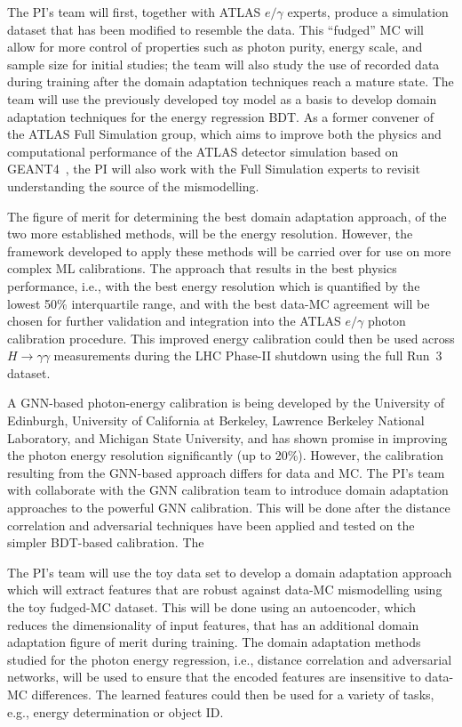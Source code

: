 \documentclass[letter, USenglish, 11pt, subfigure]{article}
\begin{document}
The PI's team will first, together with ATLAS $e/\gamma$ experts, produce a simulation dataset that has been modified to resemble the data. This ``fudged'' MC will allow for more control of properties such as photon purity, energy scale, and sample size for initial studies; the team will also study the use of recorded data during training after the domain adaptation techniques reach a mature state. The team will use the previously developed toy model as a basis to develop domain adaptation techniques for the energy regression BDT. As a former convener of the ATLAS Full Simulation group, which aims to improve both the physics and computational performance of the ATLAS detector simulation based on GEANT4~\cite{Agostinelli:2002hh}, the PI will also work with the Full Simulation experts to revisit understanding the source of the mismodelling.

The figure of merit for determining the best domain adaptation approach, of the two more established methods, will be the energy resolution. However, the framework developed to apply these methods will be carried over for use on more complex ML calibrations. The approach that results in the best physics performance, i.e., with the best energy resolution which is quantified by the lowest 50\% interquartile range, and with the best data-MC agreement will be chosen for further validation and integration into the ATLAS $e/\gamma$ photon calibration procedure. This improved energy calibration could then be used across $H\to\gamma\gamma$ measurements during the LHC Phase-II shutdown using the full Run~3 dataset.

A GNN-based photon-energy calibration is being developed by the University of Edinburgh, University of California at Berkeley, Lawrence Berkeley National Laboratory, and Michigan State University, and has shown promise in improving the photon energy resolution significantly (up to 20\%). However, the calibration resulting from the GNN-based approach differs for data and MC. The PI's team with collaborate with the GNN calibration team to introduce domain adaptation approaches to the powerful GNN calibration. This will be done after the distance correlation and adversarial techniques have been applied and tested on the simpler BDT-based calibration. The 

The PI's team will use the toy data set to develop a domain adaptation approach which will extract features that are robust against data-MC mismodelling using the toy fudged-MC dataset. This will be done using an autoencoder, which reduces the dimensionality of input features, that has an additional domain adaptation figure of merit during training. The domain adaptation methods studied for the photon energy regression, i.e., distance correlation and adversarial networks, will be used to ensure that the encoded features are insensitive to data-MC differences. The learned features could then be used for a variety of tasks, e.g., energy determination or object ID.
\end{document}
